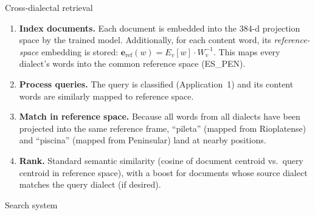 \documentclass[11pt,a4paper]{article}
\begin{document}
\begin{howbox}{Cross-dialectal retrieval}
\begin{enumerate}[nosep]
  \item \textbf{Index documents.} Each document is embedded into the
    384-d projection space by the trained model. Additionally, for
    each content word, its \emph{reference-space} embedding is stored:
    $\mathbf{e}_{\text{ref}}(w) = E_v[w] \cdot W_v^{-1}$. This maps
    every dialect's words into the common reference space (ES\_PEN).

  \item \textbf{Process queries.} The query is classified
    (Application~1) and its content words are similarly mapped to
    reference space.

  \item \textbf{Match in reference space.} Because all words from all
    dialects have been projected into the same reference frame,
    ``pileta'' (mapped from Rioplatense) and ``piscina'' (mapped
    from Peninsular) land at nearby positions.

  \item \textbf{Rank.} Standard semantic similarity (cosine of
    document centroid vs.\ query centroid in reference space), with a
    boost for documents whose source dialect matches the query dialect
    (if desired).
\end{enumerate}
\end{howbox}

\begin{archbox}{Search system}
\begin{center}
\end{center}
\end{archbox}
\end{document}

